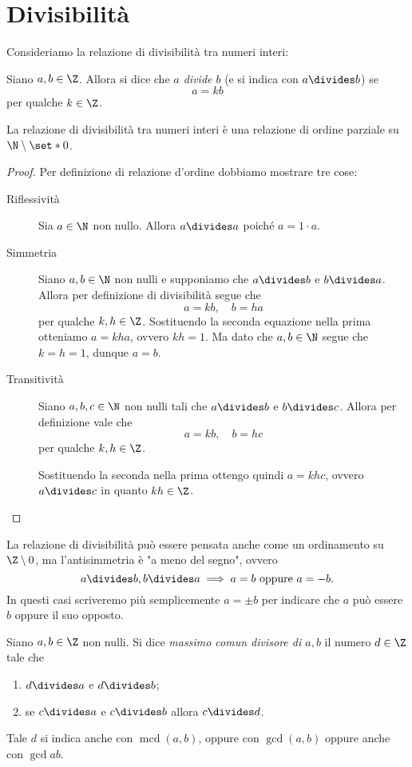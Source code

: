 \section{Divisibilità}

Consideriamo la relazione di divisibilità tra numeri interi:
\begin{definition}
    [Divisibilità]
    Siano $a, b \in \Z$. Allora si dice che \emph{$a$ divide $b$} (e si indica con $a \divides b$) se \[
        a = kb
    \] per qualche $k \in \Z$.
\end{definition}

\begin{proposition}
    La relazione di divisibilità tra numeri interi è una relazione di ordine parziale su $\N \setminus \set*{0}$.
\end{proposition}
\begin{proof}
    Per definizione di relazione d'ordine dobbiamo mostrare tre cose:
    \begin{description}
        \item[Riflessività] Sia $a \in \N$ non nullo. Allora $a \divides a$ poiché $a = 1\cdot a$.
        \item[Simmetria] Siano $a, b \in \N$ non nulli e supponiamo che $a \divides b$ e $b \divides a$. Allora per definizione di divisibilità segue che \[
            a = kb, \quad b = ha    
        \]  per qualche $k, h \in \Z$. Sostituendo la seconda equazione nella prima otteniamo $a = kha$, ovvero $kh = 1$. Ma dato che $a, b \in \N$ segue che $k = h = 1$, dunque $a = b$.
        \item[Transitività] Siano $a, b, c \in \N$ non nulli tali che $a \divides b$ e $b \divides c$. Allora per definizione vale che \[
            a = kb, \quad b = hc    
        \] per qualche $k, h \in \Z$.

        Sostituendo la seconda nella prima ottengo quindi $a = khc$, ovvero $a \divides c$ in quanto $kh \in \Z$.
    \end{description}
\end{proof}

La relazione di divisibilità può essere pensata anche come un ordinamento su $\Z \setminus {0}$, ma l'antisimmetria è "a meno del segno", ovvero \[
    a \divides b, b \divides a \implies a = b \text{ oppure } a = -b.
\] In questi casi scriveremo più semplicemente $a = \pm b$ per indicare che $a$ può essere $b$ oppure il suo opposto.

\begin{definition}
    Siano $a, b \in \Z$ non nulli. Si dice \emph{massimo comun divisore di $a,b$} il numero $d \in \Z$ tale che \begin{enumerate}[label={(\roman*)}]
        \item $d \divides a$ e $d \divides b$;
        \item se $c \divides a$ e $c \divides b$ allora $c \divides d$.
    \end{enumerate}

    Tale $d$ si indica anche con $\operatorname{mcd}(a, b)$, oppure con $\gcd(a, b)$ oppure anche con $\gcd{a}{b}$.
\end{definition}


